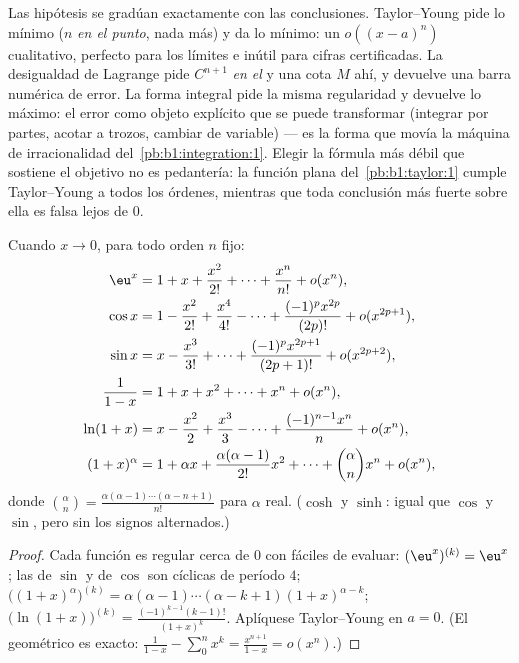 \begin{remark}
Las hipótesis se gradúan exactamente con las conclusiones.
Taylor--Young pide lo mínimo ($n$  \emph{en el punto}, nada
más) y da lo mínimo: un $o((x-a)^n)$ cualitativo, perfecto para los
límites e inútil para cifras certificadas. La desigualdad de Lagrange
pide $C^{n+1}$ \emph{en el } y una cota $M$ ahí, y devuelve
una barra numérica de error. La forma integral pide la misma
regularidad y devuelve lo máximo: el error como objeto explícito que
se puede transformar (integrar por partes, acotar a trozos, cambiar
de variable) --- es la forma que movía la máquina de irracionalidad
del~\cref{pb:b1:integration:1}. Elegir la fórmula más débil que
sostiene el objetivo no es pedantería: la función plana
del~\cref{pb:b1:taylor:1} cumple Taylor--Young a todos los órdenes,
mientras que toda conclusión más fuerte sobre ella es falsa lejos
de $0$.
\end{remark}

\begin{proposition}
Cuando $x \to 0$, para todo orden $n$ fijo:
\begin{align*}
\eu^x &= 1 + x + \frac{x^2}{2!} + \dots + \frac{x^n}{n!} + o(x^n),\\
\cos x &= 1 - \frac{x^2}{2!} + \frac{x^4}{4!} - \dots
+ \frac{(-1)^p x^{2p}}{(2p)!} + o(x^{2p+1}),\\
\sin x &= x - \frac{x^3}{3!} + \dots + \frac{(-1)^p
x^{2p+1}}{(2p+1)!} + o(x^{2p+2}),\\
\frac{1}{1 - x} &= 1 + x + x^2 + \dots + x^n + o(x^n),\\
\ln(1 + x) &= x - \frac{x^2}{2} + \frac{x^3}{3} - \dots +
\frac{(-1)^{n-1} x^n}{n} + o(x^n),\\
(1 + x)^\alpha &= 1 + \alpha x + \frac{\alpha(\alpha-1)}{2!}x^2 +
\dots + \binom{\alpha}{n} x^n + o(x^n),
\end{align*}
donde $\binom{\alpha}{n} = \frac{\alpha(\alpha - 1)\cdots(\alpha - n
+ 1)}{n!}$ para $\alpha$ real. ($\cosh$ y $\sinh$: igual que $\cos$ y
$\sin$, pero sin los signos alternados.)
\label{prop:b1:taylor:standard}
\end{proposition}

\begin{proof}
Cada función es regular cerca de $0$ con  fáciles de
evaluar: $(\eu^x)^{(k)} = \eu^x$; las  de $\sin$ y de $\cos$
son cíclicas de período $4$;
$\bigl((1+x)^\alpha\bigr)^{(k)} = \alpha(\alpha - 1)\cdots(\alpha - k
+ 1)(1+x)^{\alpha - k}$;
$\bigl(\ln(1+x)\bigr)^{(k)} = \frac{(-1)^{k-1}(k-1)!}{(1+x)^k}$.
Aplíquese Taylor--Young en $a = 0$. (El geométrico es exacto:
$\frac{1}{1-x} - \sum_0^n x^k = \frac{x^{n+1}}{1 - x} = o(x^n)$.)
\end{proof}

